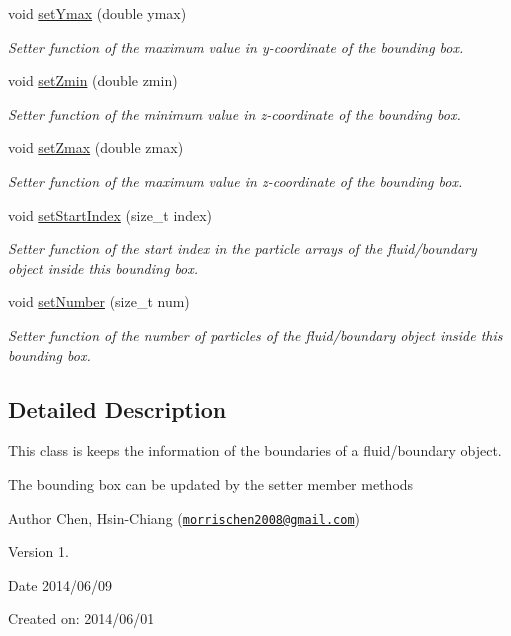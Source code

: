 \begin{DoxyCompactItemize}
void \hyperlink{classBoundingBox_a19a5c056016c30f58a56340707ac397f}{set\-Ymax} (double ymax)
\begin{DoxyCompactList}\small\item\em Setter function of the maximum value in y-\/coordinate of the bounding box. \end{DoxyCompactList}\item 
void \hyperlink{classBoundingBox_abef069da4413d58cd06d4341bf3a1f28}{set\-Zmin} (double zmin)
\begin{DoxyCompactList}\small\item\em Setter function of the minimum value in z-\/coordinate of the bounding box. \end{DoxyCompactList}\item 
void \hyperlink{classBoundingBox_abe3df56e595019f72dcd384e7af6d994}{set\-Zmax} (double zmax)
\begin{DoxyCompactList}\small\item\em Setter function of the maximum value in z-\/coordinate of the bounding box. \end{DoxyCompactList}\item 
void \hyperlink{classBoundingBox_ad01b30ce8c0812d2ecb3ca864879a6bd}{set\-Start\-Index} (size\-\_\-t index)
\begin{DoxyCompactList}\small\item\em Setter function of the start index in the particle arrays of the fluid/boundary object inside this bounding box. \end{DoxyCompactList}\item 
void \hyperlink{classBoundingBox_a639f258e55b76ff434ec9c38389b5d95}{set\-Number} (size\-\_\-t num)
\begin{DoxyCompactList}\small\item\em Setter function of the number of particles of the fluid/boundary object inside this bounding box. \end{DoxyCompactList}\end{DoxyCompactItemize}


\subsection{Detailed Description}
This class is keeps the information of the boundaries of a fluid/boundary object. 

The bounding box can be updated by the setter member methods

\begin{DoxyAuthor}{Author}
Chen, Hsin-\/\-Chiang (\href{mailto:morrischen2008@gmail.com}{\tt morrischen2008@gmail.\-com})
\end{DoxyAuthor}
\begin{DoxyVersion}{Version}
1.
\end{DoxyVersion}
\begin{DoxyDate}{Date}
2014/06/09
\end{DoxyDate}
Created on\-: 2014/06/01 

